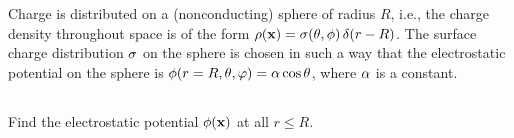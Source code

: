 \documentclass[11pt]{article}
\renewcommand{\vec}[1]{\mathbf{#1}}
\newenvironment{statement}[1]
{
	\section{#1}
	\color{darkgray}
	\ignorespaces
}
{
}
\newenvironment{problem}
{
	\subsection{}
	\color{darkgray}
    \ignorespaces
}
{

}
\begin{document}
\newcommand{\lap}{\nabla^2}
\newcommand{\Gd}{G_D}
\newcommand{\Gxxp}{G(\vx, \vx')}
\newcommand{\Gdxxp}{\Gd(\vx, \vx')}
\newcommand{\Gdxpx}{\Gd(\vx', \vx)}
\newcommand{\psixp}{\psi(\vx')}
\newcommand{\nh}{\vec{\hat{n}}}
\newcommand{\rh}{\vec{\hat{r}}}
\newcommand{\nabxp}{\nabla_{\!x'}}
\newcommand{\dSxp}{\dd{S_{x'}}}
\newcommand{\absxp}{\abs{\vx'}}

\begin{statement}{}
	Charge is distributed on a (nonconducting) sphere of radius $R$, i.e., the charge density throughout space is of the form $\rhox = \sig\tv \, \delta(r - R)$.  The surface charge distribution $\sigma$ on the sphere is chosen in such a way that the electrostatic potential on the sphere is $\phi(r=R, \theta, \varphi) = \alpha \cos\theta$, where $\alpha$ is a constant.
\end{statement}

\begin{problem}
	Find the electrostatic potential $\phix$ at all $r \leq R$.
\end{problem}
\end{document}
